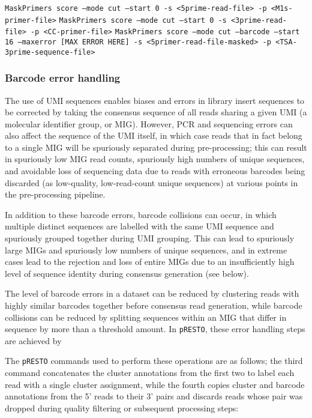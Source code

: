 \texttt{MaskPrimers score --mode cut --start 0 -s <5prime-read-file> -p <M1s-primer-file>}
\texttt{MaskPrimers score --mode cut --start 0 -s <3prime-read-file> -p <CC-primer-file>}
\texttt{MaskPrimers score --mode cut --barcode --start 16 --maxerror [MAX ERROR HERE] -s <5primer-read-file-masked> -p <TSA-3prime-sequence-file>}

\subsubsection{Barcode error handling}

The use of UMI sequences enables biases and errors in library insert sequences to be corrected by taking the consensus sequence of all reads sharing a given UMI (a molecular identifier group, or MIG). However, PCR and sequencing errors can also affect the sequence of the UMI itself, in which case reads that in fact belong to a single MIG will be spuriously separated during pre-processing; this can result in spuriously low MIG read counts, spuriously high numbers of unique sequences, and avoidable loss of sequencing data due to reads with erroneous barcodes being discarded (as low-quality, low-read-count unique sequences) at various points in the pre-processing pipeline.

In addition to these barcode errors, barcode collisions can occur, in which multiple distinct sequences are labelled with the same UMI sequence and spuriously grouped together during UMI grouping. This can lead to spuriously large MIGs and spuriously low numbers of unique sequences, and in extreme cases lead to the rejection and loss of entire MIGs due to an insufficiently high level of sequence identity during consensus generation (see below). 

The level of barcode errors in a dataset can be reduced by clustering reads with highly similar barcodes together before consensus read generation, while barcode collisions can be reduced by splitting sequences within an MIG that differ in sequence by more than a threshold amount. In \texttt{pRESTO}, these error handling steps are achieved by %

The \texttt{pRESTO} commands used to perform these operations are as follows; the third command concatenates the cluster annotations from the first two to label each read with a single cluster assignment, while the fourth copies cluster and barcode annotations from the 5' reads to their 3' pairs and discards reads whose pair was dropped during quality filtering or subsequent processing steps:

